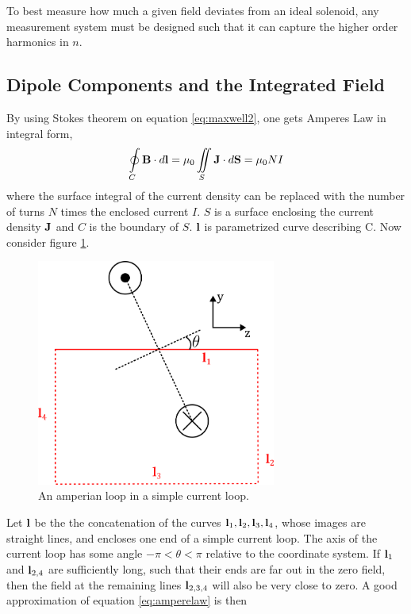 To best measure how much a given field deviates from an ideal solenoid,
any measurement system must be designed such that it can capture the
higher order harmonics in $n$.

\FloatBarrier
\subsection{Dipole Components and the Integrated Field}
By using Stokes theorem on equation \ref{eq:maxwell2}, one gets Amperes Law
in integral form,
\begin{equation}
    \oint \limits_C \vb{B} \cdot d\vb{l} =
    \mu_0 \iint\limits_S \vb{J}\cdot d\vb{S} = \mu_0 NI
    \label{eq:amperelaw}
\end{equation}
where the surface integral of the current density can be replaced
with the number of turns $N$ times the enclosed current $I$. $S$ is a surface enclosing
the current density $\vb{J}$ and $C$ is the boundary of $S$. $\vb{l}$
is parametrized curve describing C.
Now consider figure \ref{fig:ampereloop}.

\begin{figure}[!h]
    \centering
    \includegraphics[width=0.7\textwidth]{figs/ampereloop}
    \caption{An amperian loop in a simple current loop.}
    \label{fig:ampereloop}
\end{figure}

Let $\vb{l}$ be the the concatenation of the curves
$\vb{l}_1,\vb{l}_2,\vb{l}_3,\vb{l}_4 $, whose images are straight
lines, and encloses
one end of a simple current loop. The axis of the current loop
has some angle $-\pi < \theta < \pi$ relative to the coordinate system.
If $\vb{l}_1$ and $\vb{l}_{2,4}$ are sufficiently long, such that their
ends are far out in the zero field, then the field at
the remaining lines $\vb{l}_{2,3,4}$ will also be
very close to zero. A good approximation of equation \ref{eq:amperelaw}
is then

